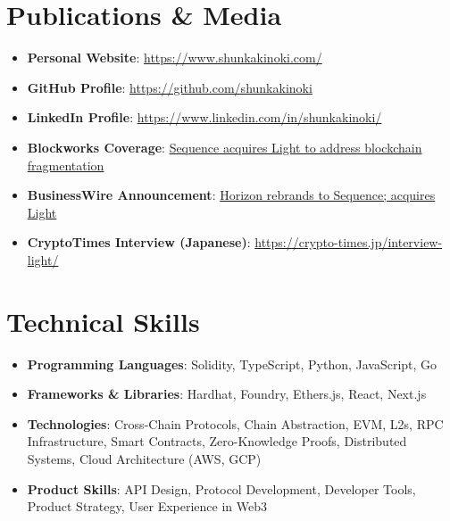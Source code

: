 \documentclass[letterpaper,11pt]{article}
\newcommand{\resumeItem}[2]{
  \item\small{
    \textbf{#1}{: #2 \vspace{-2pt}}
  }
}
\newcommand{\resumeSubHeadingListStart}{\begin{itemize}[leftmargin=*]}
\newcommand{\resumeSubHeadingListEnd}{\end{itemize}}
\begin{document}
\section{Publications \& Media}
  \resumeSubHeadingListStart
    \resumeItem{Personal Website}{\href{https://www.shunkakinoki.com/}{https://www.shunkakinoki.com/}}
    \resumeItem{GitHub Profile}{\href{https://github.com/shunkakinoki}{https://github.com/shunkakinoki}}
    \resumeItem{LinkedIn Profile}{\href{https://www.linkedin.com/in/shunkakinoki/}{https://www.linkedin.com/in/shunkakinoki/}}
    \resumeItem{Blockworks Coverage}{\href{https://blockworks.co/news/exclusive-horizon-blockchain-games-sequence-rebrand}{Sequence acquires Light to address blockchain fragmentation}}
    \resumeItem{BusinessWire Announcement}{\href{https://www.businesswire.com/news/home/20250408247816/en/Horizon-rebrands-to-Sequence-acquires-Light-to-unify-the-EVM-ecosystem-of-blockchains}{Horizon rebrands to Sequence; acquires Light}}
    \resumeItem{CryptoTimes Interview (Japanese)}{\href{https://crypto-times.jp/interview-light/}{https://crypto-times.jp/interview-light/}}
  \resumeSubHeadingListEnd

\section{Technical Skills}
  \resumeSubHeadingListStart
    \resumeItem{Programming Languages}{Solidity, TypeScript, Python, JavaScript, Go}
    \resumeItem{Frameworks \& Libraries}{Hardhat, Foundry, Ethers.js, React, Next.js}
    \resumeItem{Technologies}{Cross-Chain Protocols, Chain Abstraction, EVM, L2s, RPC Infrastructure, Smart Contracts, Zero-Knowledge Proofs, Distributed Systems, Cloud Architecture (AWS, GCP)}
    \resumeItem{Product Skills}{API Design, Protocol Development, Developer Tools, Product Strategy, User Experience in Web3}
  \resumeSubHeadingListEnd
\end{document}
